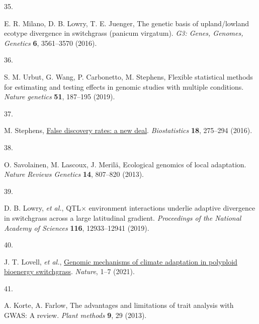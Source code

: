 \documentclass[
  9pt,
  twocolumn,
  twoside]{pnas-new}
\newlength{\cslhangindent}
\newlength{\csllabelwidth}
\newenvironment{CSLReferences}[2] %
 {\begin{list}{}{%
  \setlength{\itemindent}{0pt}
  \setlength{\leftmargin}{0pt}
  \setlength{\parsep}{0pt}
  \ifodd #1
   \setlength{\leftmargin}{\cslhangindent}
   \setlength{\itemindent}{-1\cslhangindent}
  \fi
  \setlength{\itemsep}{#2\baselineskip}}}
 {\end{list}}
\newcommand{\CSLLeftMargin}[1]{\parbox[t]{\csllabelwidth}{\strut#1\strut}}
\newcommand{\CSLRightInline}[1]{\parbox[t]{\linewidth - \csllabelwidth}{\strut#1\strut}}
\begin{document}
\begin{CSLReferences}{0}{1}
\CSLLeftMargin{35. }%
\CSLRightInline{E. R. Milano, D. B. Lowry, T. E. Juenger, The genetic
basis of upland/lowland ecotype divergence in switchgrass (panicum
virgatum). \emph{G3: Genes, Genomes, Genetics} \textbf{6}, 3561--3570
(2016).}

\CSLLeftMargin{36. }%
\CSLRightInline{S. M. Urbut, G. Wang, P. Carbonetto, M. Stephens,
Flexible statistical methods for estimating and testing effects in
genomic studies with multiple conditions. \emph{Nature genetics}
\textbf{51}, 187--195 (2019).}

\CSLLeftMargin{37. }%
\CSLRightInline{M. Stephens,
\href{https://doi.org/10.1093/biostatistics/kxw041}{{False discovery
rates: a new deal}}. \emph{Biostatistics} \textbf{18}, 275--294 (2016).}

\CSLLeftMargin{38. }%
\CSLRightInline{O. Savolainen, M. Lascoux, J. Merilä, Ecological
genomics of local adaptation. \emph{Nature Reviews Genetics}
\textbf{14}, 807--820 (2013).}

\CSLLeftMargin{39. }%
\CSLRightInline{D. B. Lowry, \emph{et al.}, QTL\(\times\) environment
interactions underlie adaptive divergence in switchgrass across a large
latitudinal gradient. \emph{Proceedings of the National Academy of
Sciences} \textbf{116}, 12933--12941 (2019).}

\CSLLeftMargin{40. }%
\CSLRightInline{J. T. Lovell, \emph{et al.},
\href{https://doi.org/10.1038/s41586-020-03127-1}{Genomic mechanisms of
climate adaptation in polyploid bioenergy switchgrass}. \emph{Nature},
1--7 (2021).}

\CSLLeftMargin{41. }%
\CSLRightInline{A. Korte, A. Farlow, The advantages and limitations of
trait analysis with GWAS: A review. \emph{Plant methods} \textbf{9}, 29
(2013).}

\end{CSLReferences}


\showacknow{} %
\end{document}
